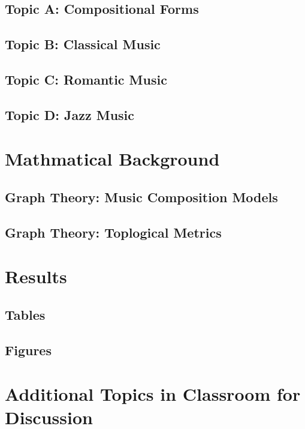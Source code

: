 \subsection{Topic A: Compositional Forms}

\subsection{Topic B: Classical Music}

\subsection{Topic C: Romantic Music}

\subsection{Topic D: Jazz Music}

\section{Mathmatical Background}

\subsection{Graph Theory: Music Composition Models}

\subsection{Graph Theory: Toplogical Metrics}

\section{Results}

\subsection{Tables}


\subsection{Figures}


\section{Additional Topics in Classroom for Discussion}

\begin{enumerate}
\end{enumerate}



\begin{thebibliography}{00}

\end{thebibliography}


